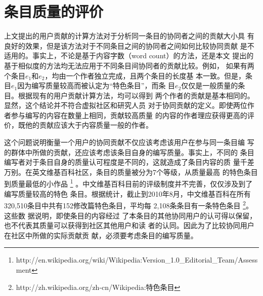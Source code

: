 \section{条目质量的评价}
  上文提出的用户贡献的计算方法对于分析同一条目的协同者之间的贡献大小具
  有良好的效果，但是该方法对于不同条目之间的协同者之间如何比较协同贡献
  是不适用的。事实上，不论是基于内容字数（word count）的方法，还是本文
  提出的基于相似度的方法均无法应用于不同条目间协同者的贡献比较。例如，
  如果有两个条目$e_1$和$e_2$，均由一个作者独立完成，且两个条目的长度基
  本一致。但是，条目$e_1$因为编写质量较高而被认定为“特色条目”，而条
  目$e_2$仅仅是一般质量的条目。根据现有的用户贡献计算方法，均可以得到
  两个作者的贡献是基本相同的。显然，这个结论并不符合虚拟社区和研究人员
  对于协同贡献的定义。即使两位作者参与编写的内容在数量上相同，贡献较高质量
  的内容的作者理应获得更高的评价，既他的贡献应该大于内容质量一般的作者。

  这个问题说明衡量一个用户的协同贡献不仅应该考虑该用户在参与同一条目编
  写的群体中所做的贡献，还应该考虑该条目自身的编写质量。事实上，不同的
  条目编写者对于条目自身的质量认可程度是不同的，这就造成了条目内容的质
  量千差万别。在英文维基百科社区，条目的质量被分为7个等级，从质量最高
  的特色条目到质量最低的小作品
  \footnote{http://en.wikipedia.org/wiki/Wikipedia:Version\_1.0\_Editorial\_Team/Assessment}
  。中文维基百科目前的评级制度并不完善，仅仅涉及到了编写质量较高的特色
  条目。根据统计，截止到2010年8月，中文维基百科在所有320,510条目中共有152修改篇特色条目，平均每
  2,108条条目有一条特色条目
  \footnote{http://zh.wikipedia.org/zh-cn/Wikipedia:特色条目}。这些数
  据说明，即使条目的内容经过
  了本条目的其他协同用户的认可得以保留，也不代表其质量可以获得到社区其他用户和读
  者的认同。因此为了比较协同用户在社区中所做的实际贡献贡
  献，必须要考虑条目的编写质量。

